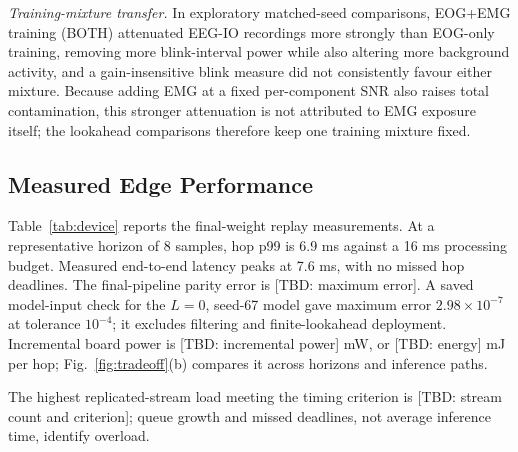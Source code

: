 \documentclass[letterpaper,journal]{IEEEtran}
\newcommand{\TBD}[1]{\textcolor{blue!65!black}{\textnormal{[TBD: #1]}}}
\begin{document}
\textit{Training-mixture transfer.} In exploratory matched-seed comparisons, EOG+EMG training (BOTH) attenuated EEG-IO recordings more strongly than EOG-only training, removing more blink-interval power while also altering more background activity, and a gain-insensitive blink measure did not consistently favour either mixture. Because adding EMG at a fixed per-component SNR also raises total contamination, this stronger attenuation is not attributed to EMG exposure itself; the lookahead comparisons therefore keep one training mixture fixed.

\subsection{Measured Edge Performance}
Table~\ref{tab:device} reports the final-weight replay measurements. At a representative horizon of 8 samples, hop p99 is 6.9 ms against a 16 ms processing budget. Measured end-to-end latency peaks at 7.6 ms, with no missed hop deadlines. The final-pipeline parity error is \TBD{maximum error}. A saved model-input check for the $L=0$, seed-67 model gave maximum error $2.98\times10^{-7}$ at tolerance $10^{-4}$; it excludes filtering and finite-lookahead deployment. Incremental board power is \TBD{incremental power} mW, or \TBD{energy} mJ per hop; Fig.~\ref{fig:tradeoff}(b) compares it across horizons and inference paths.

The highest replicated-stream load meeting the timing criterion is \TBD{stream count and criterion}; queue growth and missed deadlines, not average inference time, identify overload.
\end{document}
